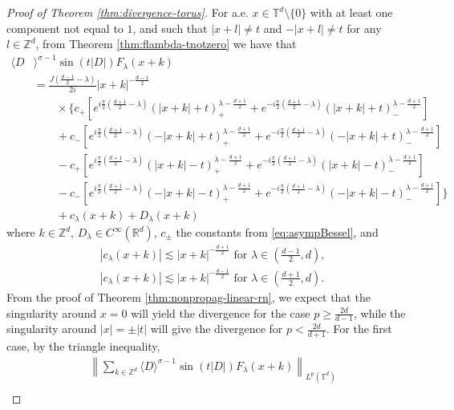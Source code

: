 \documentclass[a4paper, reqno, 11pt]{amsart}
\theoremstyle{definition}
\begin{document}
\begin{proof}[Proof of Theorem \ref{thm:divergence-torus}]
For a.e. $x \in \mathbb{T}^d \setminus \{0\}$ with at least one component not equal to $1$, and such that $|x+l| \neq t$ and $-|x+l| \neq t$ for any $l \in \mathbb{Z}^d$, from Theorem \ref{thm:flambda-tnotzero} we have that
\begin{align}\label{eq:finaldiv-3}
\langle D &\rangle^{\sigma-1} \sin(t|D|) F_{\lambda}(x+k)\nonumber \\
&= \frac{J\left(\frac{d-1}{2}-\lambda\right)}{2i} |x+k|^{-\frac{d-1}{2}} \nonumber \\
&\qquad \times  \{ c_{+} [ e^{i\frac{\pi}{2}(\frac{d+1}{2} - \lambda)} (|x+k| + t)_+^{\lambda-\frac{d+1}{2}} + e^{-i\frac{\pi}{2}(\frac{d+1}{2} - \lambda)} (|x+k| + t)_-^{\lambda-\frac{d+1}{2}}] \nonumber \\
&\qquad + c_{-}  [ e^{i\frac{\pi}{2}(\frac{d+1}{2} - \lambda)}(-|x+k| + t)_+^{\lambda-\frac{d+1}{2}} + e^{-i\frac{\pi}{2}(\frac{d+1}{2} - \lambda)} (-|x+k| + t)_-^{\lambda-\frac{d+1}{2}} ]\nonumber  \\
&\qquad - c_{+} [ e^{i\frac{\pi}{2}(\frac{d+1}{2} - \lambda)} (|x+k| - t)_+^{\lambda-\frac{d+1}{2}} + e^{-i\frac{\pi}{2}(\frac{d+1}{2} - \lambda)} (|x+k| - t)_-^{\lambda-\frac{d+1}{2}}] \nonumber \\
&\qquad - c_{-}  [ e^{i\frac{\pi}{2}(\frac{d+1}{2} - \lambda)}(-|x+k| - t)_+^{\lambda-\frac{d+1}{2}} + e^{-i\frac{\pi}{2}(\frac{d+1}{2} - \lambda)} (-|x+k| - t)_-^{\lambda-\frac{d+1}{2}} ] \}
\nonumber \\
&\qquad + c_{\lambda}(x+k) + D_{\lambda}(x+k)
\end{align}
where $k \in \mathbb{Z}^d$, $D_{\lambda} \in C^{\infty}(\mathbb{R}^d)$, $c_{\pm}$ the constants from \eqref{eq:asympBessel}, and 
\begin{align*}
&|c_{\lambda}(x+k)| \lesssim |x+k|^{-\frac{d+1}{2}} \text{ for } \lambda \in \left(\frac{d-1}{2},d\right), \nonumber \\
&|c_{\lambda}(x+k)| \lesssim |x+k|^{-\frac{d-1}{2}} \text{ for } \lambda \in \left(\frac{d+1}{2},d\right).
\end{align*}
From the proof of Theorem \ref{thm:nonpropag-linear-rn}, we expect that the singularity around $x = 0$ will yield the divergence for the case $p \geq \frac{2d}{d-1}$, while the singularity around $|x| = \pm |t|$ will give the divergence for $p < \frac{2d}{d+1}$. For the first case, by the triangle inequality,
\begin{align}\label{eq:trineq-tndiv}
&\left\| \sum_{k \in \mathbb{Z}^d}  \langle D \rangle^{\sigma-1} \sin(t|D|) F_{\lambda}(x+k)  \right\|_{L^p(\mathbb{T}^d)} \nonumber \\

\end{align}
\end{proof}
\end{document}
